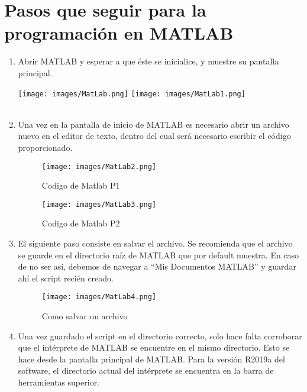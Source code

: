 \documentclass{article}
\begin{document}
\section{Pasos que seguir para la programación en MATLAB}
\begin{enumerate}
\item   Abrir MATLAB y esperar a que éste se inicialice, y muestre su pantalla principal. 

\texttt{[image: images/MatLab.png]} %
\texttt{[image: images/MatLab1.png]} %
\\
\\
\item   Una vez en la pantalla de inicio de MATLAB es necesario abrir un archivo nuevo en el editor de texto, dentro del cual será necesario escribir el código proporcionado.

\begin{figure}[h] %
    \centering
    \texttt{[image: images/MatLab2.png]} %
    \caption{Codigo de Matlab P1}
\end{figure}

\begin{figure}[h] %
    \centering
    \texttt{[image: images/MatLab3.png]} %
    \caption{Codigo de Matlab P2}
\end{figure}

\newpage

\item   El siguiente paso consiste en salvar el archivo. Se recomienda que el archivo se guarde en el directorio raíz de MATLAB que por default muestra. En caso de no ser así, debemos de navegar a “Mis Documentos  MATLAB” y guardar ahí el script recién creado. 

\begin{figure}[h] %
    \centering
    \texttt{[image: images/MatLab4.png]} %
    \caption{Como salvar un archivo}
\end{figure}

\newpage

\item   Una vez guardado el script en el directorio correcto, solo hace falta corroborar que el intérprete de MATLAB se encuentre en el mismo directorio. Esto se hace desde la pantalla principal de MATLAB. Para la versión R2019a del software, el directorio actual del intérprete se encuentra en la barra de herramientas superior.


\end{enumerate}
\end{document}
